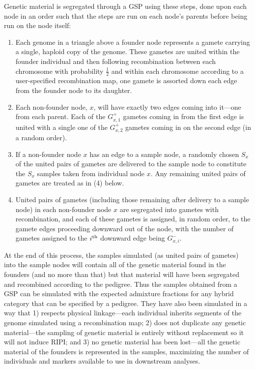 Genetic material is segregated through
a GSP using these steps, done upon each node in an order such that the steps
are run on each node's parents before being run on the node itself:
\begin{enumerate}
\item Each genome in a triangle above a founder node represents a gamete
carrying a single, haploid copy of the genome.
These gametes are united within the founder individual and then
following recombination between each chromosome
with probability $\frac{1}{2}$ and within each chromosome according to
a user-specified recombination map,
 one gamete is assorted down each edge from the founder node to its daughter.
\item Each non-founder node, $x$, will have exactly two edges coming
into it---one from each parent.  Each of the $G^+_{x,1}$ gametes coming in from the
first edge is united with a single one of the $G^+_{x,2}$ gametes coming
in on the second edge (in a random order).
\item If a non-founder node $x$ has an edge to a sample node,
a randomly chosen $S_x$ of the united pairs of gametes are delivered
to the sample node to constitute the $S_x$ samples taken from individual
node $x$. Any remaining united pairs of gametes are treated as in (4) below.
\item United pairs of gametes (including those remaining after delivery
to a sample node) in each non-founder node $x$ are segregated into
gametes with recombination, and each of these gametes is assigned, in
random order, to the gamete edges proceeding downward out of the node,
with the number of gametes assigned to the $i^\mathrm{th}$ downward edge being
$G^-_{x,i}$.
\end{enumerate}
At the end of this process, the samples simulated (as united pairs of gametes)
into the sample nodes will contain all of the genetic material found in the founders (and
no more than that)
but that material will have been segregated and recombined according to the pedigree.  Thus the
samples obtained from a GSP can be simulated with the expected admixture fractions
for any hybrid category that can be specified by a pedigree.  They have also been simulated
in a way that 1) respects physical linkage---each individual inherits segments of the genome
simulated using a recombination map; 2) does not duplicate any genetic material---the sampling of
genetic material is entirely without replacement so it will not induce RIPI; and 3) no genetic material has been lost---all the genetic material of the founders
is represented in the samples, maximizing the number of individuals and markers available to
use in downstream analyses.

